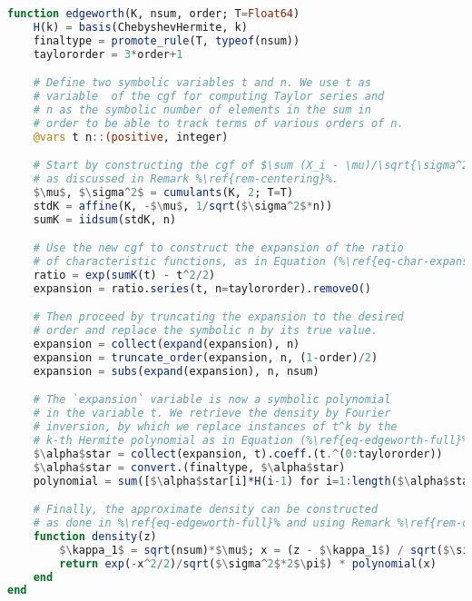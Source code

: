 \begin{lstlisting}[language=Julia, mathescape, escapechar=\%, caption={Symbolic implementation of the Edgeworth expansion}, label={lst-edgeworth}, basicstyle=\small]
function edgeworth(K, nsum, order; T=Float64)
    H(k) = basis(ChebyshevHermite, k)
    finaltype = promote_rule(T, typeof(nsum))
    taylororder = 3*order+1

    # Define two symbolic variables t and n. We use t as
    # variable  of the cgf for computing Taylor series and
    # n as the symbolic number of elements in the sum in
    # order to be able to track terms of various orders of n.
    @vars t n::(positive, integer)

    # Start by constructing the cgf of $\sum (X_i - \mu)/\sqrt{\sigma^2 n}$,
    # as discussed in Remark %\ref{rem-centering}%.
    $\mu$, $\sigma^2$ = cumulants(K, 2; T=T)
    stdK = affine(K, -$\mu$, 1/sqrt($\sigma^2$*n))
    sumK = iidsum(stdK, n)

    # Use the new cgf to construct the expansion of the ratio 
    # of characteristic functions, as in Equation (%\ref{eq-char-expansion}%).
    ratio = exp(sumK(t) - t^2/2)
    expansion = ratio.series(t, n=taylororder).removeO()

    # Then proceed by truncating the expansion to the desired 
    # order and replace the symbolic n by its true value.
    expansion = collect(expand(expansion), n)
    expansion = truncate_order(expansion, n, (1-order)/2)
    expansion = subs(expand(expansion), n, nsum)

    # The `expansion` variable is now a symbolic polynomial 
    # in the variable t. We retrieve the density by Fourier 
    # inversion, by which we replace instances of t^k by the 
    # k-th Hermite polynomial as in Equation (%\ref{eq-edgeworth-full}%).
    $\alpha$star = collect(expansion, t).coeff.(t.^(0:taylororder))
    $\alpha$star = convert.(finaltype, $\alpha$star)
    polynomial = sum([$\alpha$star[i]*H(i-1) for i=1:length($\alpha$star)])

    # Finally, the approximate density can be constructed
    # as done in %\ref{eq-edgeworth-full}% and using Remark %\ref{rem-centering}%.
    function density(z)
        $\kappa_1$ = sqrt(nsum)*$\mu$; x = (z - $\kappa_1$) / sqrt($\sigma^2$)
        return exp(-x^2/2)/sqrt($\sigma^2$*2$\pi$) * polynomial(x)
    end
end
\end{lstlisting}